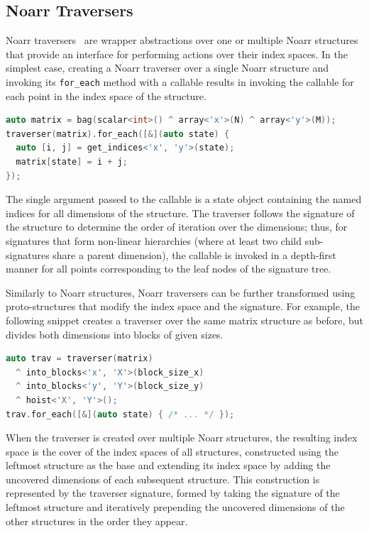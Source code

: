 \subsection{Noarr Traversers}\label{sec:noarr-traversals}

Noarr traversers~\cite{klepl2024pure} are wrapper abstractions over one or multiple Noarr structures that provide an interface for performing actions over their index spaces. In the simplest case, creating a Noarr traverser over a single Noarr structure and invoking its \lstinline{for_each} method with a callable results in invoking the callable for each point in the index space of the structure.

\begin{lstlisting}[language=C++, caption={Creating and using a Noarr traverser over a single structure.}, label=lst:noarr-traverser-single-structure]
auto matrix = bag(scalar<int>() ^ array<'x'>(N) ^ array<'y'>(M));
traverser(matrix).for_each([&](auto state) {
  auto [i, j] = get_indices<'x', 'y'>(state);
  matrix[state] = i + j;
});
\end{lstlisting}

The single argument passed to the callable is a state object containing the named indices for all dimensions of the structure. The traverser follows the signature of the structure to determine the order of iteration over the dimensions; thus, for signatures that form non-linear hierarchies (where at least two child sub-signatures share a parent dimension), the callable is invoked in a depth-first manner for all points corresponding to the leaf nodes of the signature tree.

Similarly to Noarr structures, Noarr traversers can be further transformed using proto-structures that modify the index space and the signature. For example, the following snippet creates a traverser over the same matrix structure as before, but divides both dimensions into blocks of given sizes.

\begin{lstlisting}[language=C++, caption={Creating a Noarr traverser with blocked traversal.}, label=lst:noarr-traverser-blocked]
auto trav = traverser(matrix)
  ^ into_blocks<'x', 'X'>(block_size_x)
  ^ into_blocks<'y', 'Y'>(block_size_y)
  ^ hoist<'X', 'Y'>();
trav.for_each([&](auto state) { /* ... */ });
\end{lstlisting}

When the traverser is created over multiple Noarr structures, the resulting index space is the cover of the index spaces of all structures, constructed using the leftmost structure as the base and extending its index space by adding the uncovered dimensions of each subsequent structure. This construction is represented by the traverser signature, formed by taking the signature of the leftmost structure and iteratively prepending the uncovered dimensions of the other structures in the order they appear.

